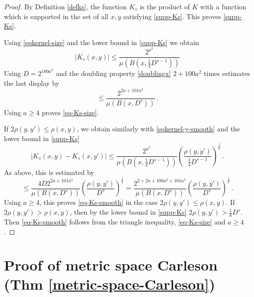 \begin{proof}
    By Definition \eqref{defks}, the function $K_s$ is the product of
    $K$ with a function which is supported in the set of all
    $x,y$ satisfying \eqref{supp-Ks}. This proves
    \eqref{supp-Ks}.

    Using \eqref{eqkernel-size} and the lower bound in \eqref{supp-Ks}
    we obtain
    \begin{equation}
        |K_s(x,y)|\le \frac{2^{a^3}}{\mu(B(x,\frac 14 D^{s-1}))}
    \end{equation}
    Using $D=2^{100a^2}$
    and the doubling property \eqref{doublingx} $2 +100a^2$ times estimates
    the last display by
    \begin{equation}
        \label{eq-Ks-aux}
        \le \frac{2^{2a+101a^3}}{\mu(B(x,  D^{s}))}\, .
    \end{equation}
    Using $a\ge 4$ proves \eqref{eq-Ks-size}.

    If $2\rho(y,y') \le \rho(x,y)$, we obtain similarly with \eqref{eqkernel-y-smooth} and the lower bound in
    \eqref{supp-Ks}
    \begin{equation}
        |K_s(x,y)-K_s(x, y')|\le \frac{2^{a^3}}{\mu(B(x, \frac 14 D^{s-1}))}
        \left(\frac{ \rho(y,y')}{\frac 14 D^{s-1}}\right)^{\frac 1a}\,.
    \end{equation}
    As above, this is estimated by
    \begin{equation}
       \le \frac{4D 2^{2a+101a^3}}{\mu(B(x,  D^{s}))}
        \left(\frac{ \rho(y,y')}{D^{s}}\right)^{\frac 1a}
         = \frac{2^{2+2a+100a^2+101a^3}}{\mu(B(x,  D^{s}))}
        \left(\frac{ \rho(y,y')}{D^{s}}\right)^{\frac 1a}\,.
    \end{equation}
    Using $a\ge 4$, this proves \eqref{eq-Ks-smooth} in the case $2\rho(y,y') \le \rho(x,y)$. If $2\rho(y,y') > \rho(x,y)$, then by the lower bound in \eqref{supp-Ks} $2\rho(y,y') > \frac{1}{8}D^s$. Then \eqref{eq-Ks-smooth} follows from the triangle inequality, \eqref{eq-Ks-size} and $a \ge 4$.
\end{proof}


\chapter{Proof of metric space Carleson (Thm \ref{metric-space-Carleson})}
\label{thmfromproplinear}


